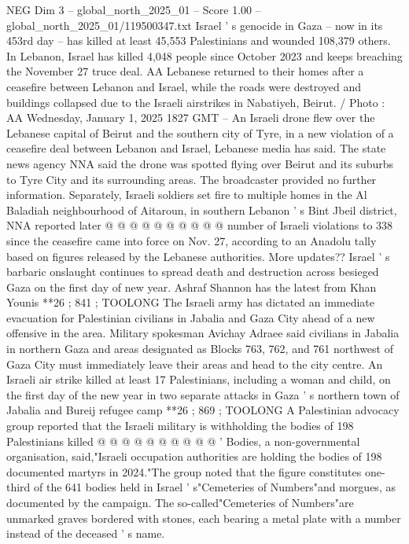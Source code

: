 \begin{textsample}{NEG Dim 3 – global\_north\_2025\_01 – Score 1.00 – global\_north\_2025\_01/119500347.txt}  \label{ex:f3_neg_212}
Israel ' s genocide in Gaza -- now in its 453rd day -- has killed at least 45,553 Palestinians and wounded 108,379 others.
In Lebanon, Israel has killed 4,048 people since October 2023 and keeps breaching the November 27 truce deal.
AA Lebanese returned to their homes after a ceasefire between Lebanon and Israel, while the roads were destroyed and buildings collapsed due to the Israeli airstrikes in Nabatiyeh, Beirut. / Photo : AA Wednesday, January 1, 2025 1827 GMT -- An Israeli drone flew over the Lebanese capital of Beirut and the southern city of Tyre, in a new violation of a ceasefire deal between Lebanon and Israel, Lebanese media has said.
The state news agency NNA said the drone was spotted flying over Beirut and its suburbs to Tyre City and its surrounding areas.
The broadcaster provided no further information.
Separately, Israeli soldiers set fire to multiple homes in the Al Baladiah neighbourhood of Aitaroun, in southern Lebanon ' s Bint Jbeil district, NNA reported later @ @ @ @ @ @ @ @ @ @ number of Israeli violations to 338 since the ceasefire came into force on Nov. 27, according to an Anadolu tally based on figures released by the Lebanese authorities.
More updates??
Israel ' s barbaric onslaught continues to spread death and destruction across besieged Gaza on the first day of new year.
Ashraf Shannon has the latest from Khan Younis **26 ; 841 ; TOOLONG The Israeli army has dictated an immediate evacuation for Palestinian civilians in Jabalia and Gaza City ahead of a new offensive in the area.
Military spokesman Avichay Adraee said civilians in Jabalia in northern Gaza and areas designated as Blocks 763, 762, and 761 northwest of Gaza City must immediately leave their areas and head to the city centre.
An Israeli air strike killed at least 17 Palestinians, including a woman and child, on the first day of the new year in two separate attacks in Gaza ' s northern town of Jabalia and Bureij refugee camp **26 ; 869 ; TOOLONG A Palestinian advocacy group reported that the Israeli military is withholding the bodies of 198 Palestinians killed @ @ @ @ @ @ @ @ @ @ ' Bodies, a non-governmental organisation, said,"Israeli occupation authorities are holding the bodies of 198 documented martyrs in 2024."The group noted that the figure constitutes one-third of the 641 bodies held in Israel ' s"Cemeteries of Numbers"and morgues, as documented by the campaign.
The so-called"Cemeteries of Numbers"are unmarked graves bordered with stones, each bearing a metal plate with a number instead of the deceased ' s name.

\end{textsample}
